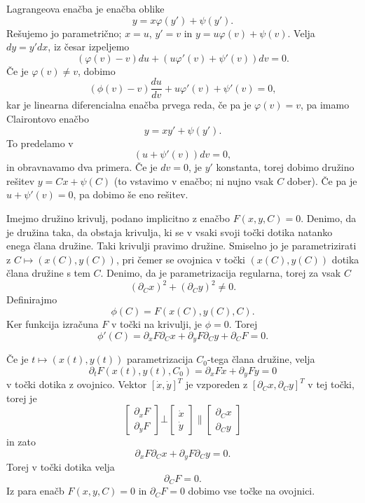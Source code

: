 

Lagrangeova enačba je enačba oblike
\[
  y = x \varphi(y') + \psi(y').
\]
Rešujemo jo parametrično; $x = u$, $y' = v$ in $y = u \varphi(v) + \psi(v)$.
Velja $dy = y' dx$, iz česar izpeljemo
\[
  (\varphi(v) - v) du + (u \varphi'(v) + \psi'(v)) dv = 0.
\]
Če je $\varphi(v) \ne v$, dobimo
\[
  (\phi(v) - v) \frac{du}{dv} + u \varphi'(v) + \psi'(v) = 0,
\]
kar je linearna diferencialna enačba prvega reda, če pa je $\varphi(v) = v$, pa
imamo Clairontovo enačbo
\[
  y = x y' + \psi(y').
\]
To predelamo v
\[
  (u + \psi'(v)) dv = 0,
\]
in obravnavamo dva primera.
Če je $dv = 0$, je $y'$ konstanta, torej dobimo družino rešitev $y = Cx +
\psi(C)$ (to vstavimo v enačbo; ni nujno vsak $C$ dober).
Če pa je $u + \psi'(v) = 0$, pa dobimo še eno rešitev.



Imejmo družino krivulj, podano implicitno z enačbo $F(x, y, C) = 0$.
Denimo, da je družina taka, da obstaja krivulja, ki se v vsaki svoji točki
dotika natanko enega člana družine.
Taki krivulji pravimo  družine.
Smiselno jo je parametrizirati z $C \mapsto (x(C), y(C))$, pri čemer se ovojnica
v točki $(x(C), y(C))$ dotika člana družine s tem $C$.
Denimo, da je parametrizacija regularna, torej za vsak $C$
\[
  (\partial_C x)^2 + (\partial_C y)^2 \ne 0.
\]
Definirajmo
\[
  \phi(C) = F(x(C), y(C), C).
\]
Ker funkcija izračuna $F$ v točki na krivulji, je $\phi = 0$.
Torej
\[
  \phi'(C) = \partial_x F \partial_C x + \partial_y F \partial_C y + \partial_C
  F = 0.
\]

Če je $t \mapsto (x(t), y(t))$ parametrizacija $C_0$-tega člana družine, velja
\[
  \partial_t F(x(t), y(t), C_0)
  = \partial_x F \dot{x} + \partial_y F \dot{y} = 0
\]
v točki dotika z ovojnico.
Vektor $[\dot{x}, \dot{y}]^T$ je vzporeden z $[\partial_C x, \partial_C y]^T$ v
tej točki, torej je
\[
  \begin{bmatrix}
	\partial_x F \\ \partial_y F
  \end{bmatrix}
  \bot
  \begin{bmatrix}
	\dot{x} \\ \dot{y}
  \end{bmatrix}
  \parallel
  \begin{bmatrix}
	\partial_C x \\ \partial_C y
  \end{bmatrix}
\]
in zato
\[
  \partial_x F \partial_C x + \partial_y F \partial_C y = 0.
\]
Torej v točki dotika velja
\[
  \partial_C F = 0.
\]
Iz para enačb $F(x, y, C) = 0$ in $\partial_C F = 0$ dobimo vse točke na
ovojnici.


